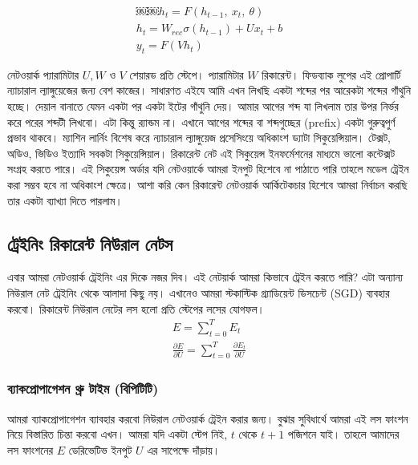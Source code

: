 \documentclass{article}[book]
\begin{document}
\begin{align} %
  ￼￼h_t = F(h_{t−1}, \ x_t, \ θ)\\
  h_t = W_{rec} \sigma (h_{t−1}) + U x_t + b \\ 
  y_t = F(V h_t)
\end{align}

নেটওয়ার্ক প্যারামিটার $U, W$ ও $V$ শেয়ারড প্রতি স্টেপে। প্যারামিটার $W$ রিকারেন্ট। ফিডব্যাক লুপের এই প্রোপার্টি ন্যাচারাল ল্যাঙ্গুয়েজের জন্য বেশ কাজের। 
সাধারণত এইযে আমি এখন লিখছি একটা শব্দের পর আরেকটা শব্দের গাঁথুনি হচ্ছে। দেয়াল বানাতে যেমন একটা পর একটা ইটের গাঁথুনি দেয়। 
আমার আগের শব্দ যা লিখলাম তার উপর নির্ভর করে পরের শব্দটী লিখবো। এটা কিন্তু র‍্যান্ডম না। এখানে আগের শব্দের বা শব্দগুচ্ছের (prefix)  একটা গুরুত্বপুর্ণ প্রভাব থাকবে। 
ম্যাশিন লার্নিং বিশেষ করে ন্যাচারাল ল্যাঙ্গুয়েজ প্রসেসিংয়ে  অধিকাংশ ড্যাটা সিকুয়েন্সিয়াল। টেক্সট, অডিও, ভিডিও ইত্যাদি সবকটা সিকুয়েন্সিয়াল।
রিকারেন্ট নেট এই সিকুয়েন্স ইনফর্মেশনের মাধ্যমে ভালো কন্টেক্সট সংগ্রহ করতে পারে। এই সিকুয়েন্স অর্ডার যদি নেটওয়ার্কে আমরা ইনপুট হিশেবে না পাঠাতে পারি তাহলে 
মডেল ট্রেইন করা সম্ভব হবে না অধিকাংশ ক্ষেত্রে। আশা করি কেন রিকারেন্ট নেটওয়ার্ক আর্কিটেকচার হিশেবে আমরা নির্বাচন করছি তার একটা ব্যাখ্যা দিতে পারলাম। 

\subsection{ট্রেইনিং রিকারেন্ট নিউরাল নেটস}
এবার আমরা নেটওয়ার্ক ট্রেইনিং এর দিকে নজর দিব। এই নেটয়ার্ক আমরা কিভাবে ট্রেইন করতে পারি? এটা অন্যান্য নিউরাল নেট ট্রেইনিং থেকে আলাদা কিছু নয়।
এখানেও আমরা স্টকাস্টিক গ্র্যাডিয়েন্ট ডিসচেন্ট  (SGD) ব্যবহার করবো। রিকারেন্ট নিউরাল নেটের লস হলো প্রতি স্টেপের লসের যোগফল। 
\begin{align} %
   E = \sum_{t=0} ^{T} E_t \\
   \frac {\partial E} {\partial U} = \sum _{t=0} ^{T} \frac {\partial E_t} { \partial U}
\end{align}



\subsubsection{ব্যাকপ্রোপাগেশন থ্রু টাইম (বিপিটিটি)}
আমরা ব্যাকপ্রোপাগেশন ব্যাবহার করবো নিউরাল নেটওয়ার্ক ট্রেইন করার জন্য। বুঝার সুবিধার্থে আমরা এই লস ফাংশন নিয়ে বিস্তারিত চিন্তা করবো এখন। আমরা যদি একটা স্টেপ নিই, $t$ থেকে $t+1$ পজিশনে যাই। তাহলে আমাদের লস ফাংশনের $E$ ডেরিভেটিভ ইনপুট $U$ এর সাপেক্ষে দাঁড়ায়। 
\end{document}
